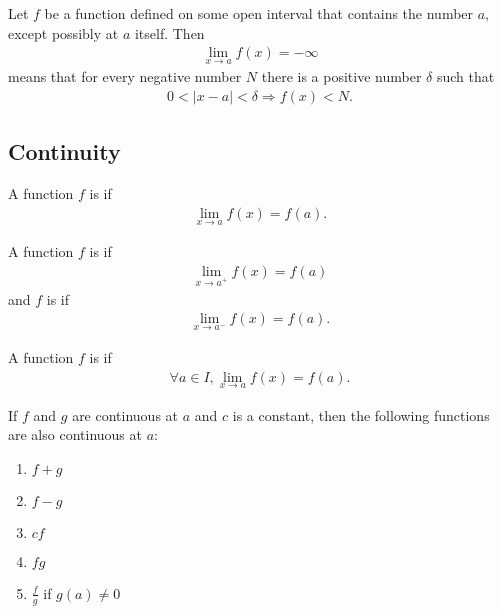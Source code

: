 \documentclass{article}
\begin{document}
\begin{definition}
    Let $f$ be a function defined on some open interval that contains the number $a$, except possibly at $a$ itself. Then
    \begin{align*}
        \lim_{x\to a}f(x) = -\infty
    \end{align*} 
    means that for every negative number $N$ there is a positive number $\delta$ such that
    \begin{align*}
        0<|x-a|<\delta \Rightarrow f(x)<N.
    \end{align*}
\end{definition}
\subsection{Continuity}
\begin{definition}
    A function $f$ is  if
    \begin{align*}
        \lim_{x\to a}f(x)=f(a).
    \end{align*}
\end{definition}
\begin{definition}
    A function $f$ is  if
    \begin{align*}
        \lim_{x\to a^+}f(x) = f(a)
    \end{align*}
    and $f$ is  if
    \begin{align*}
        \lim_{x\to a^-}f(x) = f(a).
    \end{align*}
\end{definition}
\begin{definition}
    A function $f$ is  if 
    \begin{align*}
        \forall a \in I, \lim_{x\to a}f(x) = f(a).
    \end{align*}
\end{definition}
\begin{theorem}
    If $f$ and $g$ are continuous at $a$ and $c$ is a constant, then the following functions are also continuous at $a$:
    \begin{enumerate}
        \item $f+g$
        \item $f-g$
        \item $cf$
        \item $fg$
        \item $\frac{f}{g}$ if $g(a)\not= 0$
    \end{enumerate}
\end{theorem}
\end{document}
